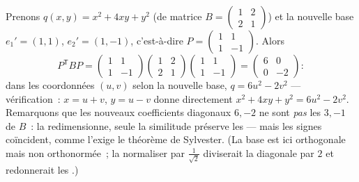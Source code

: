 \begin{example}\label{ex:b2:quadratic:congruence}
Prenons $q(x, y) = x^2 + 4xy + y^2$ (de matrice $B = \begin{pmatrix}
1 & 2\\ 2 & 1\end{pmatrix}$) et la nouvelle base $e_1' = (1, 1)$,
$e_2' = (1, -1)$, c'est-à-dire $P = \begin{pmatrix} 1 & 1\\ 1 &
-1\end{pmatrix}$. Alors
\[
P^{\mathsf T}BP
= \begin{pmatrix} 1 & 1\\ 1 & -1\end{pmatrix}
\begin{pmatrix} 1 & 2\\ 2 & 1\end{pmatrix}
\begin{pmatrix} 1 & 1\\ 1 & -1\end{pmatrix}
= \begin{pmatrix} 6 & 0\\ 0 & -2\end{pmatrix} :
\]
dans les coordonnées $(u, v)$ selon la nouvelle base, $q = 6u^2 -
2v^2$ --- vérification~: $x = u + v$, $y = u - v$ donne directement
$x^2 + 4xy + y^2 = 6u^2 - 2v^2$. Remarquons que les nouveaux
coefficients diagonaux $6, -2$ ne sont \emph{pas} les  $3, -1$ de $B$~: la  redimensionne, seule la
similitude préserve les  --- mais les signes coïncident,
comme l'exige le théorème de Sylvester. (La base est ici orthogonale
mais non orthonormée~; la normaliser par $\frac{1}{\sqrt2}$
diviserait la diagonale par $2$ et redonnerait les .)
\end{example}

